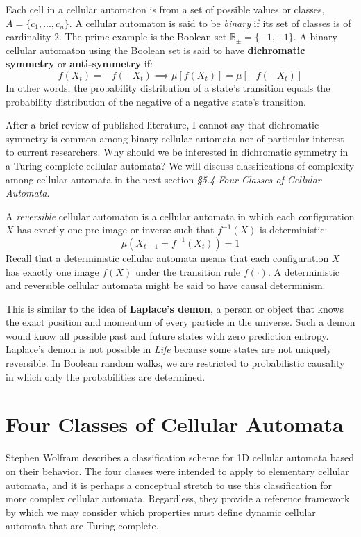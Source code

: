\documentclass[10pt, a5paper, twoside, openright]{memoir}
\begin{document}
Each cell in a cellular automaton is from a set of possible values or classes, $A = \{c_1,...,c_n\}$. A cellular automaton is said to be \textit{binary} if its set of classes is of cardinality $2$. The prime example is the Boolean set $\mathbb B_\pm = \{-1, +1\}$. A binary cellular automaton using the Boolean set is said to have \textbf{dichromatic symmetry} or \textbf{anti-symmetry} if:
$$f(X_t) = -f(-X_t) \implies \mu[f(X_t)] = \mu[-f(-X_t)]$$
In other words, the probability distribution of a state's transition equals the probability distribution of the negative of a negative state's transition.

After a brief review of published literature, I cannot say that dichromatic symmetry is common among binary cellular automata nor of particular interest to current researchers. Why should we be interested in dichromatic symmetry in a Turing complete cellular automata? We will discuss classifications of complexity among cellular automata in the next section \textit{\S 5.4 Four Classes of Cellular Automata}.

A \textit{reversible} cellular automaton is a cellular automata in which each configuration $X$ has exactly one pre-image or inverse such that $f^{-1}(X)$ is deterministic:
$$\mu( X_{t-1} = f^{-1}(X_t)) = 1$$
Recall that a deterministic cellular automata means that each configuration $X$ has exactly one image $f(X)$ under the transition rule $f(\cdot)$. A deterministic and reversible cellular automata might be said to have causal determinism. 

This is similar to the idea of \textbf{Laplace's demon}, a person or object that knows the exact position and momentum of every particle in the universe. Such a demon would know all possible past and future states with zero prediction entropy. Laplace's demon is not possible in \textit{Life} because some states are not uniquely reversible. In Boolean random walks, we are restricted to probabilistic causality in which only the probabilities are determined.

\section{Four Classes of Cellular Automata}
Stephen Wolfram describes a classification scheme for 1D cellular automata based on their behavior. The four classes were intended to apply to elementary cellular automata, and it is perhaps a conceptual stretch to use this classification for more complex cellular automata. Regardless, they provide a reference framework by which we may consider which properties must define dynamic cellular automata that are Turing complete.
\end{document}
